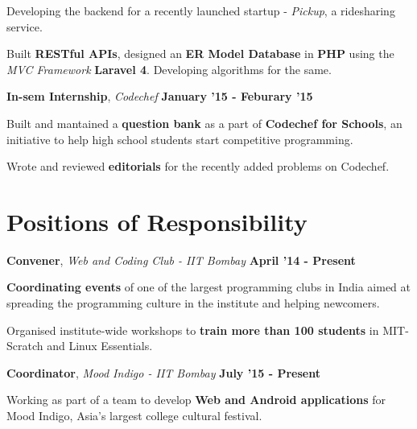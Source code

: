 \documentclass[11pt]{resume}
\begin{document}
\begin{resume}
\begin{list2}
\item Developing the backend for a recently launched startup - \textit {Pickup}, a ridesharing service.
\item Built \textbf {RESTful APIs}, designed an \textbf {ER Model Database} in \textbf {PHP} using the \textit {MVC Framework} \textbf{Laravel 4}. Developing algorithms for the same.
\end{list2}

\textbf{In-sem Internship}, \textsl{Codechef} \hfill \textbf{January '15 - Feburary '15}\\
\vspace{-4mm}
\begin{list2}
\item Built and mantained a \textbf{question bank} as a part of \textbf {Codechef for Schools}, an initiative to help high school students start competitive programming.
\item Wrote and reviewed \textbf{editorials} for the recently added problems on Codechef.
\end{list2}

\section{\mysidestyle Positions of Responsibility}
\textbf{Convener}, \textit{Web and Coding Club - IIT Bombay} \hfill \textbf{April '14 - Present}\\

\vspace{-4mm}
\begin{list2}
\item \textbf{Coordinating events} of one of the largest programming clubs in India aimed at spreading the programming culture in the institute and helping newcomers.
\item Organised institute-wide workshops to \textbf{train more than 100 students} in MIT-Scratch and Linux Essentials.
\end{list2}

\textbf{Coordinator}, \textit{Mood Indigo - IIT Bombay} \hfill \textbf{July '15 - Present}\\
\vspace{-4mm}
\begin{list2}
\item Working as part of a team to develop \textbf{Web and Android applications} for Mood Indigo, Asia's largest college cultural festival. 
\end{list2}


\end{resume}
\end{document}
